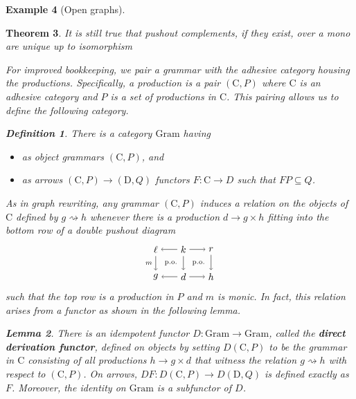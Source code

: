 \documentclass{amsart}
\newcommand{\C}{\cat{C}}
\newcommand{\D}{\cat{D}}
\newcommand{\Gram}{\cat{Gram}}
\newcommand{\Gram}{\cat{Gram}}
\newcommand{\defn}[1]{\textbf{#1}}
\newcommand{\cat}[1]{\mathrm{#1}}
\newcommand{\from}{\colon}
\newcommand{\dderiv}[2]{#1 \rightsquigarrow #2}
\newcommand{\spn}[3]{#2 \to #1 \times #3}
\newcommand{\spn}[3]{#2 \to #1 \times #3}
\newtheorem{theorem}{Theorem}[section]
\newtheorem{lemma}[theorem]{Lemma}
\theoremstyle{remark}
\theoremstyle{definition}
\newtheorem{example}[theorem]{Example}
\newtheorem{definition}[theorem]{Definition}
\begin{document}
\begin{example}[Open graphs]
{{\begin{theorem}
It is still true that pushout complements, if they exist, over a mono
are unique up to isomorphism \cite[Lem.~15]{LackSobo_Adhesive}

For improved bookkeeping, we pair a grammar with the adhesive category
housing the productions. Specifically, a production is a pair $ ( \C ,
P) $ where $ \C $ is an adhesive category and $ P $ is a set of
productions in $ \C $. This pairing allows us to define the following category.

\begin{definition}
  There is a category $ \Gram $ having
  \begin{itemize}
  \item as object grammars $ ( \C , P ) $, and
  \item as arrows $ ( \C , P ) \to ( \D , Q ) $ functors $ F \from
    \C \to D $ such that $ FP \subseteq Q $.
  \end{itemize}
\end{definition}

As in graph rewriting, any grammar $ ( \C , P ) $ induces a relation
on the objects of $ \C $ defined by $ \dderiv{g}{h} $ whenever there
is a production $ \spn{g}{d}{h} $ fitting into the bottom row of a
double pushout diagram
%
\[
  \begin{tikzpicture}
    \node (1) at (0,1) {\( \ell \)};
    \node (2) at (1,1) {\( k \)};
    \node (3) at (2,1) {\( r \)};
    \node (4) at (0,0) {\( g \)};
    \node (5) at (1,0) {\( d \)};
    \node (6) at (2,0) {\( h \)};
    \draw [->] (2) to node [] {\scriptsize{\( \)}} (1);
    \draw [->] (2) to node [] {\scriptsize{\( \)}} (3);
    \draw [->] (5) to node [] {\scriptsize{\( \)}} (4);
    \draw [->] (5) to node [] {\scriptsize{\( \)}} (6);
    \draw [->] (1) to node [left] {\scriptsize{\( m \)}} (4);
    \draw [->] (2) to node [] {\scriptsize{\( \)}} (5);
    \draw [->] (3) to node [] {\scriptsize{\( \)}} (6);
    \node () at (0.5,0.5) {\scriptsize{ p.o.\ }};
    \node () at (1.5,0.5) {\scriptsize{ p.o.\ }};
  \end{tikzpicture}
\]
% 
such that the top row is a production in $ P $ and $ m $ is monic. In
fact, this relation arises from a functor as shown in the following lemma. 

\begin{lemma}
  There is an idempotent functor $ D \from \Gram \to \Gram $, called
  the \defn{direct derivation functor}, defined on objects by setting
  $ D ( \C , P ) $ to be the grammar in $ \C $ consisting of all
  productions $ \spn{g}{h}{d} $ that witness the relation
  $ \dderiv{g}{h} $ with respect to $ ( \C , P ) $. On arrows,
  $ DF \from D( \C , P ) \to D( \D , Q ) $ is defined exactly as
  $ F $.  Moreover, the identity on $ \Gram $ is a subfunctor of
  $ D $.
\end{lemma}


\end{theorem}}}
\end{example}
\end{document}
